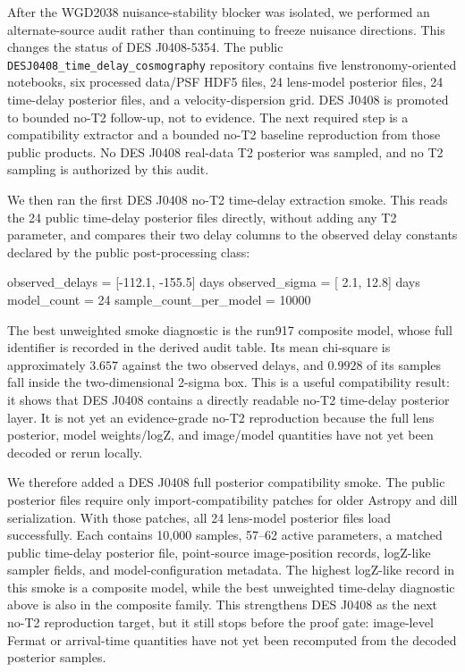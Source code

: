 \documentclass[11pt]{article}
\newenvironment{Shaded}{}{}
\newcommand{\NormalTok}[1]{#1}
\begin{document}
After the WGD2038 nuisance-stability blocker was isolated, we performed an
alternate-source audit rather than continuing to freeze nuisance directions.
This changes the status of DES J0408-5354.  The public
\texttt{DESJ0408\_time\_delay\_cosmography} repository contains five
lenstronomy-oriented notebooks, six processed data/PSF HDF5 files, 24
lens-model posterior files, 24 time-delay posterior files, and a
velocity-dispersion grid.  DES J0408 is promoted to bounded no-T2 follow-up,
not to evidence.  The next required step is a compatibility extractor and a
bounded no-T2 baseline reproduction from those public products.  No DES J0408
real-data T2 posterior was sampled, and no T2 sampling is authorized by this
audit.

We then ran the first DES J0408 no-T2 time-delay extraction smoke.  This reads
the 24 public time-delay posterior files directly, without adding any T2
parameter, and compares their two delay columns to the observed delay constants
declared by the public post-processing class:

\begin{Shaded}
\begin{Highlighting}[]
\NormalTok{observed\_delays = [-112.1, -155.5] days}
\NormalTok{observed\_sigma  = [   2.1,   12.8] days}
\NormalTok{model\_count = 24}
\NormalTok{sample\_count\_per\_model = 10000}
\end{Highlighting}
\end{Shaded}

The best unweighted smoke diagnostic is the run917 composite model, whose full
identifier is recorded in the derived audit table.  Its mean chi-square is
approximately \(3.657\) against the two observed delays, and \(0.9928\) of its
samples fall inside the two-dimensional 2-sigma box.  This is a useful
compatibility result: it shows that DES J0408 contains a directly readable
no-T2 time-delay posterior layer.  It is not yet an evidence-grade no-T2
reproduction because the full lens posterior, model weights/logZ, and
image/model quantities have not yet been decoded or rerun locally.

We therefore added a DES J0408 full posterior compatibility smoke.  The public
posterior files require only import-compatibility patches for older Astropy and
dill serialization.  With those patches, all 24 lens-model posterior files load
successfully.  Each contains 10,000 samples, 57--62 active parameters, a matched
public time-delay posterior file, point-source image-position records, logZ-like
sampler fields, and model-configuration metadata.  The highest logZ-like record
in this smoke is a composite model, while the best unweighted time-delay
diagnostic above is also in the composite family.  This strengthens DES J0408
as the next no-T2 reproduction target, but it still stops before the proof
gate: image-level Fermat or arrival-time quantities have not yet been
recomputed from the decoded posterior samples.
\end{document}
